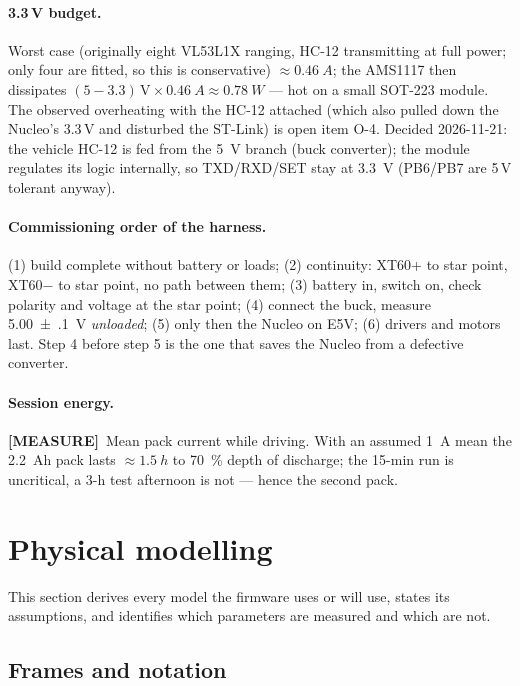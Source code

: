 \documentclass[11pt,a4paper]{article}
\newcommand{\mk}[2]{\textsf{\scriptsize\bfseries\colorbox{#1bg}{\color{#1}[#2]}}}
\newcommand{\MEASURE}{\mk{warn}{MEASURE}}
\begin{document}
\paragraph{3.3\,V budget.} Worst case (originally eight VL53L1X ranging, HC-12
transmitting at full power; only four are fitted, so this is conservative) $\approx\qty{0.46}{A}$; the AMS1117 then dissipates
$(5-3.3)\,\text{V}\times\qty{0.46}{A}\approx\qty{0.78}{W}$ --- hot on a small
SOT-223 module. The observed overheating with the HC-12 attached (which also
pulled down the Nucleo's 3.3\,V and disturbed the ST-Link) is open item O-4.
Decided 2026-11-21: the vehicle HC-12 is fed from the \qty{5}{V} branch (buck converter);
the module regulates its logic internally, so TXD/RXD/SET stay at \qty{3.3}{V} (PB6/PB7 are 5\,V tolerant anyway).

\paragraph{Commissioning order of the harness.} (1) build complete without
battery or loads; (2) continuity: XT60+ to star point, XT60$-$ to star point, no
path between them; (3) battery in, switch on, check polarity and voltage at the
star point; (4) connect the buck, measure \qty{5.00(10)}{V} \emph{unloaded};
(5) only then the Nucleo on E5V; (6) drivers and motors last. Step 4 before step
5 is the one that saves the Nucleo from a defective converter.

\paragraph{Session energy.} \MEASURE\ Mean pack current while driving. With
an assumed \qty{1}{A} mean the \qty{2.2}{Ah} pack lasts $\approx\qty{1.5}{h}$ to
\qty{70}{\percent} depth of discharge; the 15-min run is uncritical, a 3-h test
afternoon is not --- hence the second pack.
\clearpage
\section{Physical modelling}\label{sec:physics}

This section derives every model the firmware uses or will use, states its
assumptions, and identifies which parameters are measured and which are not.

\subsection{Frames and notation}\label{sec:frames}
\end{document}
